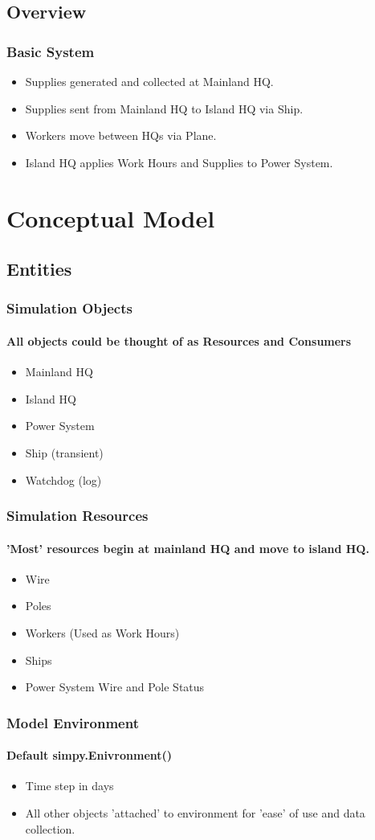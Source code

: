 \documentclass[14pt, unknownkeysallowed]{beamer}
\begin{document}
\subsection{Overview}
\begin{frame}
\frametitle{Basic System}
\begin{itemize}
	\item Supplies generated and collected at Mainland HQ.
	\item Supplies sent from Mainland HQ to Island HQ via Ship.
	\item Workers move between HQs via Plane.
	\item Island HQ applies Work Hours and Supplies to Power System.
\end{itemize}
\end{frame}


\section{Conceptual Model}
\subsection{Entities}
\begin{frame}
\frametitle{Simulation Objects}
\framesubtitle{All objects could be thought of as Resources and Consumers}
\begin{itemize}
	\item Mainland HQ
	\item Island HQ
	\item Power System
	\item Ship (transient)
	\item Watchdog (log)
\end{itemize}
\end{frame}
\begin{frame}
\frametitle{Simulation Resources}
\framesubtitle{'Most' resources begin at mainland HQ and move to island HQ.}
\begin{itemize}
	\item Wire
	\item Poles
	\item Workers (Used as Work Hours)
	\item Ships
	\item Power System Wire and Pole Status
\end{itemize}
\end{frame}
\begin{frame}
\frametitle{Model Environment}
\framesubtitle{Default simpy.Enivronment()}
\begin{itemize}
	\item Time step in days
	\item All other objects 'attached' to environment for 'ease' of use and data collection.
\end{itemize}
\end{frame}
\end{document}
